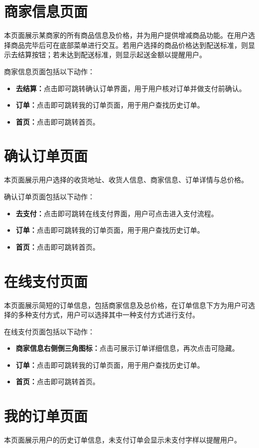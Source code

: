 \documentclass[UTF8]{ctexart}
\begin{document}
\section{商家信息页面}
本页面展示某商家的所有商品信息及价格，并为用户提供增减商品功能。在用户选择商品完毕后可在底部菜单进行交互。若用户选择的商品价格达到配送标准，则显示去结算按钮；若未达到配送标准，则显示起送金额以提醒用户。

商家信息页面包括以下动作：
\begin{itemize}
    \item \textbf{去结算：}点击即可跳转确认订单界面，用于用户核对订单并做支付前确认。
    \item \textbf{订单：}点击即可跳转我的订单页面，用于用户查找历史订单。
    \item \textbf{首页：}点击即可跳转首页。
\end{itemize}

\section{确认订单页面}
本页面展示用户选择的收货地址、收货人信息、商家信息、订单详情与总价格。

确认订单页面包括以下动作：
\begin{itemize}
    \item \textbf{去支付：}点击即可跳转在线支付界面，用户可点击进入支付流程。
    \item \textbf{订单：}点击即可跳转我的订单页面，用于用户查找历史订单。
    \item \textbf{首页：}点击即可跳转首页。
\end{itemize}

\section{在线支付页面}
本页面展示简短的订单信息，包括商家信息及总价格，在订单信息下方为用户可选择的多种支付方式，用户可以选择其中一种支付方式进行支付。

在线支付页面包括以下动作：
\begin{itemize}
    \item \textbf{商家信息右侧倒三角图标：}点击可展示订单详细信息，再次点击可隐藏。
    \item \textbf{订单：}点击即可跳转我的订单页面，用于用户查找历史订单。
    \item \textbf{首页：}点击即可跳转首页。
\end{itemize}

\section{我的订单页面}
本页面展示用户的历史订单信息，未支付订单会显示未支付字样以提醒用户。
\end{document}
